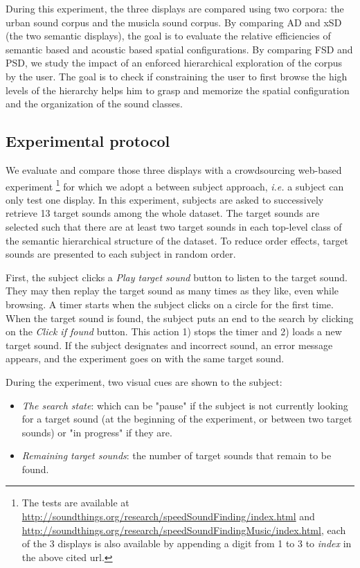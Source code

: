 \documentclass{aes2e}
\begin{document}
During this experiment, the three displays are compared using two corpora: the urban sound corpus and the musicla sound corpus. By comparing AD and xSD (the two semantic displays), the goal is to evaluate the  relative efficiencies of semantic based and acoustic based spatial configurations. By comparing FSD and PSD, we study the impact of an enforced hierarchical exploration of the corpus by the user. The goal is to check if constraining the user to first browse the high levels of the hierarchy helps him to grasp and memorize the spatial configuration and the organization of the sound classes. 

\subsection{Experimental protocol}

We evaluate and compare those three displays with a crowdsourcing web-based experiment \footnote{The tests are available at \url{http://soundthings.org/research/speedSoundFinding/index.html} and \url{http://soundthings.org/research/speedSoundFindingMusic/index.html}, each of the 3 displays is also available by appending a digit from 1 to 3 to \textit{index} in the above cited url.} for which we adopt a between subject approach, \textit{i.e.} a subject can only test one display. In this experiment, subjects are asked to successively retrieve 13 target sounds among the whole dataset. The target sounds are selected such that there are at least two target sounds in each top-level class of the semantic hierarchical structure of the dataset. To reduce order effects, target sounds are presented to each subject in random order.

First, the subject clicks a \textit{Play target sound} button to listen to the target sound. They may then replay the target sound as many times as they like, even while browsing. A timer starts when the subject clicks on a circle for the first time. When the target sound is found, the subject puts an end to the search by clicking on the \textit{Click if found} button. This action 1) stops the timer and 2) loads a new target sound. If the subject designates and incorrect sound, an error message appears, and the experiment goes on with the same target sound.

During the experiment, two visual cues are shown to the subject:
\begin{itemize}
\item \textit{The search state}: which can be "pause" if the subject is not currently looking for a target sound (at the beginning of the experiment, or between two target sounds) or  "in progress"  if they are.
\item \textit{Remaining target sounds}: the number of target sounds that remain to be found.
\end{itemize}
\end{document}
